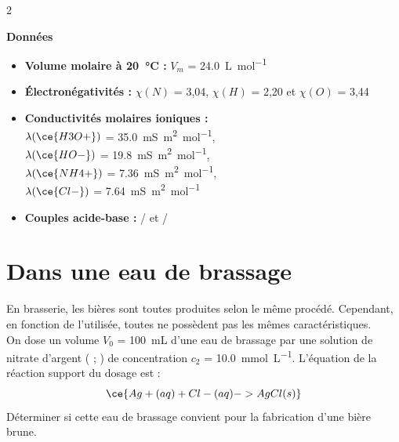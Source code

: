 \documentclass[a4paper,11pt,fleqn]{article}%
\begin{document}
\begin{multicols}{2}
    \noindent \colorbox{red!10}{\begin{minipage}{.48\textwidth}
    \textbf{Données}
    \begin{itemize}
        \item \textbf{Volume molaire à \SI{20}{\celsius} :} $V_m$ = \SI{24,0}{\liter\per\mole}
        
        \item \textbf{Électronégativités :} $\chi(N)$ = 3,04, $\chi(H)$ = 2,20 et $\chi(O)$ = 3,44
        
        \item \textbf{Conductivités molaires ioniques :}\\
            $\lambda(\ce{H3O+})$ = \SI{35,0}{\milli\siemens\meter\squared\per\mole},\\
            $\lambda(\ce{HO-})$ = \SI{19,8}{\milli\siemens\meter\squared\per\mole}, \\
            $\lambda(\ce{NH4+})$ = \SI{7,36}{\milli\siemens\meter\squared\per\mole}, \\
            $\lambda(\ce{Cl-})$ = \SI{7,64}{\milli\siemens\meter\squared\per\mole}
        
        \item \textbf{Couples acide-base :} / et /
    \end{itemize}
    
    \end{minipage}}
    
    
    \section{Dans une eau de brassage}
    En brasserie, les bières sont toutes produites selon le même procédé. Cependant, en fonction de l'utilisée, toutes ne possèdent pas les mêmes caractéristiques.\\
    On dose un volume $V_0$ = \SI{100}{mL} d'une eau de brassage par une solution de nitrate d'argent ( ; ) de concentration $c_2$ = \SI{10,0}{\milli\mole\per\liter}. L'équation de la réaction support du dosage est :
    $$\ce{Ag+(aq) + Cl-(aq) -> AgCl(s)}$$
    Déterminer si cette eau de brassage convient pour la fabrication d'une bière brune.
    

\end{multicols}
\end{document}
